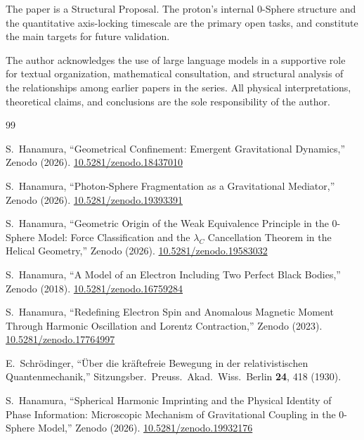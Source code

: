 \documentclass[%
 reprint, amsmath,amssymb, aps, prd, ]{revtex4-2}
\numberwithin{equation}{section}
\begin{document}
The paper is a Structural Proposal.
The proton's internal 0-Sphere structure and the quantitative axis-locking timescale are the primary open tasks, and constitute the main targets for future validation.

\begin{acknowledgments}
The author acknowledges the use of large language models in a supportive role for textual organization, mathematical consultation, and structural analysis of the relationships among earlier papers in the series. All physical interpretations, theoretical claims, and conclusions are the sole responsibility of the author.
\end{acknowledgments}

\begin{thebibliography}{99}


S.~Hanamura, ``Geometrical Confinement: Emergent Gravitational Dynamics,''
Zenodo (2026). \href{https://doi.org/10.5281/zenodo.18437010}{10.5281/zenodo.18437010}

S.~Hanamura, ``Photon-Sphere Fragmentation as a Gravitational Mediator,''
Zenodo (2026). \href{https://doi.org/10.5281/zenodo.19393391}{10.5281/zenodo.19393391}

S.~Hanamura, ``Geometric Origin of the Weak Equivalence Principle in the
0-Sphere Model: Force Classification and the $\lambda_C$ Cancellation
Theorem in the Helical Geometry,'' Zenodo (2026).
\href{https://doi.org/10.5281/zenodo.19583032}{10.5281/zenodo.19583032}

S.~Hanamura, ``A Model of an Electron Including Two Perfect Black Bodies,''
Zenodo (2018). \href{https://doi.org/10.5281/zenodo.16759284}{10.5281/zenodo.16759284}

S.~Hanamura, ``Redefining Electron Spin and Anomalous Magnetic Moment Through Harmonic Oscillation and Lorentz Contraction,''
Zenodo (2023). \href{https://doi.org/10.5281/zenodo.17764997}{10.5281/zenodo.17764997}

E.~Schr\"{o}dinger, ``\"{U}ber die kr\"{a}ftefreie Bewegung in der relativistischen Quantenmechanik,''
Sitzungsber.\ Preuss.\ Akad.\ Wiss.\ Berlin \textbf{24}, 418 (1930).

S.~Hanamura, ``Spherical Harmonic Imprinting and the Physical Identity of
Phase Information: Microscopic Mechanism of Gravitational Coupling in the
0-Sphere Model,'' Zenodo (2026).
\href{https://doi.org/10.5281/zenodo.19932176}{10.5281/zenodo.19932176}


\end{thebibliography}
\end{document}
